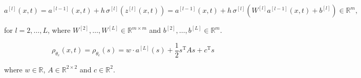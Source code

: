 \begin{equation*}
    a^{[l]}(x,t) = a^{[l-1]}(x,t) + h \, \sigma^{[l]} (z^{[l]}(x,t)) = a^{[l-1]}(x,t) + h \, \sigma^{[l]} (W^{[l]} a^{[l-1]}(x,t) + b^{[l]}) \in \mathbb{R}^{m}, 
\end{equation*}

for $l = 2, \ldots, L$, where $W^{[2]}, \ldots, W^{[L]} \in \mathbb{R}^{m \times m}$ and $b^{[2]}, \ldots, b^{[L]} \in \mathbb{R}^{m}$.

\begin{equation*}
    \rho_{\theta_e}(x, t) = \rho_{\theta_e}(s) = w \cdot a^{[L]}(s) + \frac{1}{2} s^{\mathrm{T}} A s + c^{\mathrm{T}} s 
\end{equation*}

where $w \in \mathbb{R}$, $A \in \mathbb{R}^{2 \times 2}$ and $c \in \mathbb{R}^2$.
